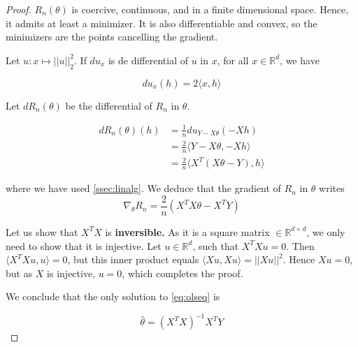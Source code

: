 \documentclass[
10pt, %
a4paper, %
oneside, %
headinclude,footinclude, %
BCOR5mm, %
]{scrartcl}
\begin{document}
\begin{proof}

    $R_n(\theta)$ is coercive, continuous, and in a finite dimensional space. Hence, it admits at least a minimizer. It is also differentiable and convex, so the minimizers are the points cancelling the gradient.

    Let $u:x\mapsto ||u||_2^2$. If $du_x$ is de differential of $u$ in $x$, for all $x\in \mathbb{R}^d$, we have

    \begin{equation*}
	du_x(h) = 2\langle x,h\rangle
    \end{equation*}

    Let $dR_n(\theta)$ be the differential of $R_n$ in $\theta$.

    \begin{equation*}
	\begin{aligned}
	    dR_n(\theta)(h) &= \frac{1}{n} du_{Y-X\theta}(-Xh)\\
	    &= \frac{2}{n} \langle Y-X\theta, -Xh \rangle\\
	    &= \frac{2}{n} \langle X^T(X\theta-Y), h \rangle
	\end{aligned}
    \end{equation*}

    where we have used \ref{ssec:linalg}. We deduce that the gradient of $R_n$ in $\theta$ writes
    \begin{equation}
	\label{eq:olseq}
        \nabla_{\theta} R_n = \frac{2}{n} (X^TX\theta-X^TY)
    \end{equation}

    Let us show that $X^TX$ is \textbf{{inversible.}} As it is a square matrix $\in \mathbb{R}^{d\times d}$, we only need to show that it is injective. Let $u\in \mathbb{R}^d$, such that $X^TXu = 0$. Then $ \langle X^TXu, u \rangle=0$, but this inner product equals $\langle Xu, Xu \rangle = ||Xu||^2$. Hence $Xu=0$, but as $X$ is injective, $u=0$, which completes the proof.

    We conclude that the only solution to \ref{eq:olseq} is 

    \begin{equation*}
	\hat{\theta} = (X^TX)^{-1}X^TY
    \end{equation*}



\end{proof}
\end{document}
